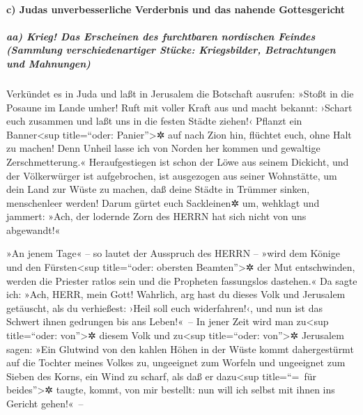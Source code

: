 \hypertarget{c-judas-unverbesserliche-verderbnis-und-das-nahende-gottesgericht}{%
\paragraph{c) Judas unverbesserliche Verderbnis und das nahende
Gottesgericht}\label{c-judas-unverbesserliche-verderbnis-und-das-nahende-gottesgericht}}

\hypertarget{aa-krieg-das-erscheinen-des-furchtbaren-nordischen-feindes-sammlung-verschiedenartiger-stuxfccke-kriegsbilder-betrachtungen-und-mahnungen}{%
\subparagraph{aa) Krieg! Das Erscheinen des furchtbaren nordischen
Feindes (Sammlung verschiedenartiger Stücke: Kriegsbilder, Betrachtungen
und
Mahnungen)}\label{aa-krieg-das-erscheinen-des-furchtbaren-nordischen-feindes-sammlung-verschiedenartiger-stuxfccke-kriegsbilder-betrachtungen-und-mahnungen}}

Verkündet es in Juda und laßt in Jerusalem die Botschaft
ausrufen: »Stoßt in die Posaune im Lande umher! Ruft mit voller Kraft
aus und macht bekannt: ›Schart euch zusammen und laßt uns in die festen
Städte ziehen!‹ Pflanzt ein Banner\textless sup
title=``oder: Panier''\textgreater✲ auf nach Zion hin, flüchtet euch,
ohne Halt zu machen! Denn Unheil lasse ich von Norden her kommen und
gewaltige Zerschmetterung.« Heraufgestiegen ist schon der
Löwe aus seinem Dickicht, und der Völkerwürger ist aufgebrochen, ist
ausgezogen aus seiner Wohnstätte, um dein Land zur Wüste zu machen, daß
deine Städte in Trümmer sinken, menschenleer werden! Darum
gürtet euch Sackleinen✲ um, wehklagt und jammert: »Ach, der lodernde
Zorn des HERRN hat sich nicht von uns abgewandt!«

»An jenem Tage« -- so lautet der Ausspruch des HERRN --
»wird dem Könige und den Fürsten\textless sup title=``oder: obersten
Beamten''\textgreater✲ der Mut entschwinden, werden die Priester ratlos
sein und die Propheten fassungslos dastehen.« Da sagte
ich: »Ach, HERR, mein Gott! Wahrlich, arg hast du dieses Volk und
Jerusalem getäuscht, als du verhießest: ›Heil soll euch widerfahren!‹,
und nun ist das Schwert ihnen gedrungen bis ans Leben!«~--
In jener Zeit wird man zu\textless sup title=``oder:
von''\textgreater✲ diesem Volk und zu\textless sup title=``oder:
von''\textgreater✲ Jerusalem sagen: »Ein Glutwind von den kahlen Höhen
in der Wüste kommt dahergestürmt auf die Tochter meines Volkes zu,
ungeeignet zum Worfeln und ungeeignet zum Sieben des Korns,
ein Wind zu scharf, als daß er dazu\textless sup
title=``=~für beides''\textgreater✲ taugte, kommt, von mir bestellt: nun
will ich selbst mit ihnen ins Gericht gehen!«~--

